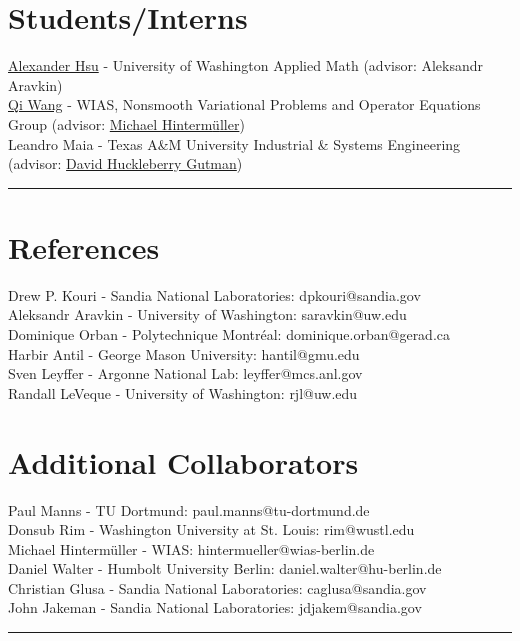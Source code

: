 \documentclass[11pt, a4paper]{article}
\begin{document}
\section*{Students/Interns}
\href{https://ahsu98.github.io/}{Alexander Hsu} - University of Washington Applied Math (advisor: Aleksandr Aravkin) \\
\href{https://www.wias-berlin.de/~wang/?lang=1}{Qi Wang} - WIAS, Nonsmooth Variational Problems and Operator Equations Group (advisor: \href{https://www.wias-berlin.de/~hintermueller/?lang=1}{Michael Hinterm{\"u}ller})\\
Leandro Maia - Texas A\&M University Industrial \& Systems Engineering (advisor: \href{https://dhgutman.github.io/}{David Huckleberry Gutman})\\
\hrule
\section*{References}
 Drew P. Kouri - Sandia National Laboratories: dpkouri@sandia.gov \\
 Aleksandr Aravkin - University of Washington: saravkin@uw.edu \\
 Dominique Orban - Polytechnique Montr\'eal: dominique.orban@gerad.ca \\
 Harbir Antil - George Mason University: hantil@gmu.edu\\
 Sven Leyffer - Argonne National Lab: leyffer@mcs.anl.gov \\
 Randall LeVeque - University of Washington: rjl@uw.edu \\
\section*{Additional Collaborators}
 Paul Manns - TU Dortmund: paul.manns@tu-dortmund.de\\
 Donsub Rim - Washington University at St. Louis: rim@wustl.edu\\
 Michael Hinterm{\"u}ller - WIAS: hintermueller@wias-berlin.de\\
 Daniel Walter - Humbolt University Berlin: daniel.walter@hu-berlin.de\\
 Christian Glusa - Sandia National Laboratories: caglusa@sandia.gov\\
 John Jakeman - Sandia National Laboratories: jdjakem@sandia.gov\\
\hrule
\end{document}
